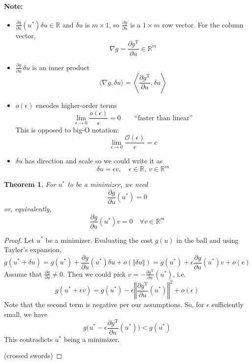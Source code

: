 \documentclass[letterpaper,12pt,titlepage]{report}
\newcommand{\trans}{^\text{T}}
\newcommand*\pder[2]{\frac{\partial #1}{\partial #2}}
\theoremstyle{plain}
\newtheorem*{thm}{Theorem}
\theoremstyle{definition}
\begin{document}
\paragraph{Note:} \mbox{}
\begin{itemize}
\item $\displaystyle \pder{g}{u}(u^*) \delta u \in \mathbb R$ and $\delta u$ is $m\times 1$, so $\displaystyle \pder{g}{u}$ is a $1\times m$ row vector. For the column vector,
\[ \nabla g = \pder{g\trans}{u} \in \mathbb R^m \]
\item $\displaystyle \pder{g}{u} \, \delta u$ is an inner product
\[ \langle \nabla g, \delta u \rangle = \left\langle \pder{g\trans}{u}, \delta u \right\rangle \]
\item $o(\epsilon)$ encodes higher-order terms
\[ \lim_{\epsilon\to 0} \frac{o(\epsilon)}{\epsilon} = 0 \qquad \text{``faster than linear''} \]
This is opposed to big-O notation:
\[ \lim_{\epsilon\to 0} \frac{\mathcal O(\epsilon)}{\epsilon} = c \]
\item $\delta u$ has direction and scale so we could write it as
\[ \delta u = \epsilon v, \quad \epsilon\in\mathbb R,\ v\in\mathbb R^m \]
\end{itemize}

\begin{thm}
For $u^*$ to be a minimizer, we need
\[ \pder{g}{u} (u^*) = 0 \]
or, equivalently,
\[ \pder{g}{u} (u^*) v = 0 \quad \forall v\in\mathbb R^m \]
\end{thm}

\begin{proof}
Let $u^*$ be a minimizer. Evaluating the cost $g(u)$ in the ball and using Taylor's expansion,
\[ g(u^* + \delta u) = g(u^*) + \pder{g}{u} (u^*) \delta u + o(\Vert\delta u\Vert) = g(u^*) + \epsilon \pder{g}{u} (u^*) v + o(\epsilon) \]
Assume that $\pder{g}{u} \neq 0$. Then we could pick $v=-\pder{g\trans}{u}(u^*)$, i.e.
\[ g(u^*+\epsilon v) = g(u^*) - \epsilon \left\Vert \pder{g\trans}{u} (u^*) \right\Vert^2 + o(\epsilon) \]
Note that the second term is negative per our assumptions. So, for $\epsilon$ sufficiently small, we have
\[ g \Big( u^* - \epsilon\pder{g\trans}{u} (u^*) \Big) < g(u^*) \]
This contradicts $u^*$ being a minimizer. \quad
{}
(crossed swords)
\end{proof}
\end{document}
